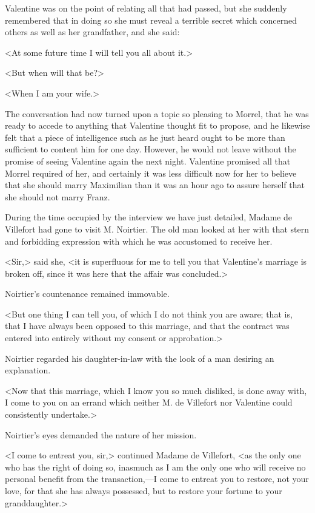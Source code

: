 Valentine was on the point of relating all that had passed, but she suddenly remembered that in doing so she must reveal a terrible secret which concerned others as well as her grandfather, and she said: 

 <At some future time I will tell you all about it.> 

 <But when will that be?> 

 <When I am your wife.> 

 The conversation had now turned upon a topic so pleasing to Morrel, that he was ready to accede to anything that Valentine thought fit to propose, and he likewise felt that a piece of intelligence such as he just heard ought to be more than sufficient to content him for one day. However, he would not leave without the promise of seeing Valentine again the next night. Valentine promised all that Morrel required of her, and certainly it was less difficult now for her to believe that she should marry Maximilian than it was an hour ago to assure herself that she should not marry Franz. 

 During the time occupied by the interview we have just detailed, Madame de Villefort had gone to visit M. Noirtier. The old man looked at her with that stern and forbidding expression with which he was accustomed to receive her. 

 <Sir,> said she, <it is superfluous for me to tell you that Valentine's marriage is broken off, since it was here that the affair was concluded.> 

 Noirtier's countenance remained immovable. 

 <But one thing I can tell you, of which I do not think you are aware; that is, that I have always been opposed to this marriage, and that the contract was entered into entirely without my consent or approbation.> 

 Noirtier regarded his daughter-in-law with the look of a man desiring an explanation. 

 <Now that this marriage, which I know you so much disliked, is done away with, I come to you on an errand which neither M. de Villefort nor Valentine could consistently undertake.> 

 Noirtier's eyes demanded the nature of her mission. 

 <I come to entreat you, sir,> continued Madame de Villefort, <as the only one who has the right of doing so, inasmuch as I am the only one who will receive no personal benefit from the transaction,—I come to entreat you to restore, not your love, for that she has always possessed, but to restore your fortune to your granddaughter.> 

